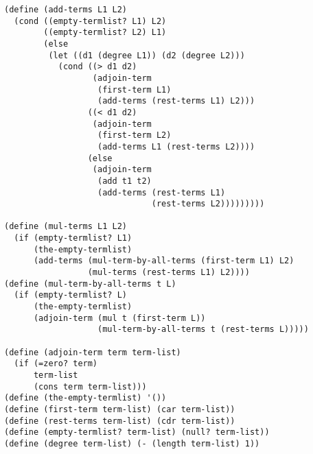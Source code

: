 \documentclass[a4paper,12pt]{article}
\begin{document}
\begin{lstlisting}
(define (add-terms L1 L2)
  (cond ((empty-termlist? L1) L2)
        ((empty-termlist? L2) L1)
        (else
         (let ((d1 (degree L1)) (d2 (degree L2)))
           (cond ((> d1 d2)
                  (adjoin-term
                   (first-term L1)
                   (add-terms (rest-terms L1) L2)))
                 ((< d1 d2)
                  (adjoin-term
                   (first-term L2)
                   (add-terms L1 (rest-terms L2))))
                 (else
                  (adjoin-term
                   (add t1 t2)
                   (add-terms (rest-terms L1)
                              (rest-terms L2)))))))))

(define (mul-terms L1 L2)
  (if (empty-termlist? L1)
      (the-empty-termlist)
      (add-terms (mul-term-by-all-terms (first-term L1) L2)
                 (mul-terms (rest-terms L1) L2))))
(define (mul-term-by-all-terms t L)
  (if (empty-termlist? L)
      (the-empty-termlist)
      (adjoin-term (mul t (first-term L))
                   (mul-term-by-all-terms t (rest-terms L)))))

(define (adjoin-term term term-list)
  (if (=zero? term)
      term-list
      (cons term term-list)))
(define (the-empty-termlist) '())
(define (first-term term-list) (car term-list))
(define (rest-terms term-list) (cdr term-list))
(define (empty-termlist? term-list) (null? term-list))
(define (degree term-list) (- (length term-list) 1))      
\end{lstlisting}
\end{document}

